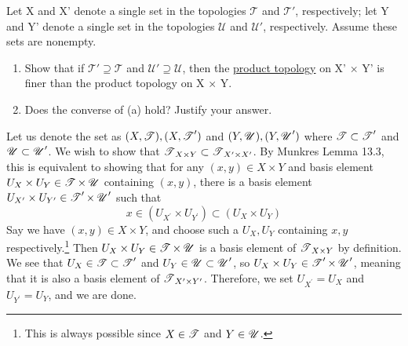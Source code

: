   \begin{exercise}[Munkres 16.5]
    Let X and X' denote a single set in the topologies $\mathcal{T}$ and $\mathcal{T}'$, respectively; let Y and Y' denote a single set in the topologies $\mathcal{U}$ and $\mathcal{U}'$, respectively. Assume these sets are nonempty.
    \begin{enumerate}
      \item Show that if $\mathcal{T}' \supseteq \mathcal{T}$ and $\mathcal{U}' \supseteq \mathcal{U}$, then the \hyperref[def:product-topology]{product topology} on X' × Y' is finer than the product topology on X × Y.
      \item Does the converse of (a) hold? Justify your answer.
    \end{enumerate}
  \end{exercise}
  \begin{solution}[Munkres 16.5.a] 
    Let us denote the set as $(X,\operatorname{\mathscr{T}}), (X, \operatorname{\mathscr{T}}^\prime)$ and $(Y, \operatorname{\mathscr{U}}), (Y, \operatorname{\mathscr{U}}^\prime)$ where $\operatorname{\mathscr{T}} \subset \operatorname{\mathscr{T}}^\prime$ and $\operatorname{\mathscr{U}} \subset \operatorname{\mathscr{U}}^\prime$. We wish to show that $\operatorname{\mathscr{T}}_{X \times Y} \subset \operatorname{\mathscr{T}}_{X^\prime \times X^\prime}$. By Munkres Lemma 13.3, this is equivalent to showing that for any $(x, y) \in X \times Y$ and basis element $U_X \times U_Y \in \operatorname{\mathscr{T}} \times \operatorname{\mathscr{U}}$ containing $(x, y)$, there is a basis element $U_{X^\prime} \times U_{Y^\prime} \in \operatorname{\mathscr{T}}^\prime \times \operatorname{\mathscr{U}}^\prime$ such that 
    \begin{equation}
      x \in (U_{X^\prime} \times U_{Y^\prime}) \subset (U_X \times U_Y)
    \end{equation}
    Say we have $(x, y) \in X \times Y$, and choose such a $U_X, U_Y$ containing $x, y$ respectively.\footnote{This is always possible since $X \in \operatorname{\mathscr{T}}$ and $Y \in \operatorname{\mathscr{U}}$. } Then $U_X \times U_Y \in \operatorname{\mathscr{T}} \times \operatorname{\mathscr{U}}$ is a basis element of $\operatorname{\mathscr{T}}_{X \times Y}$ by definition. We see that $U_X \in \operatorname{\mathscr{T}} \subset \operatorname{\mathscr{T}}^\prime$ and $U_Y \in \operatorname{\mathscr{U}} \subset \operatorname{\mathscr{U}}^\prime$, so $U_X \times U_Y \in \operatorname{\mathscr{T}}^\prime \times \operatorname{\mathscr{U}}^\prime$, meaning that it is also a basis element of $\operatorname{\mathscr{T}}_{X^\prime \times Y^\prime}$. Therefore, we set $U_{X^\prime} = U_X$ and $U_{Y^\prime} = U_Y$, and we are done. 
  \end{solution}

